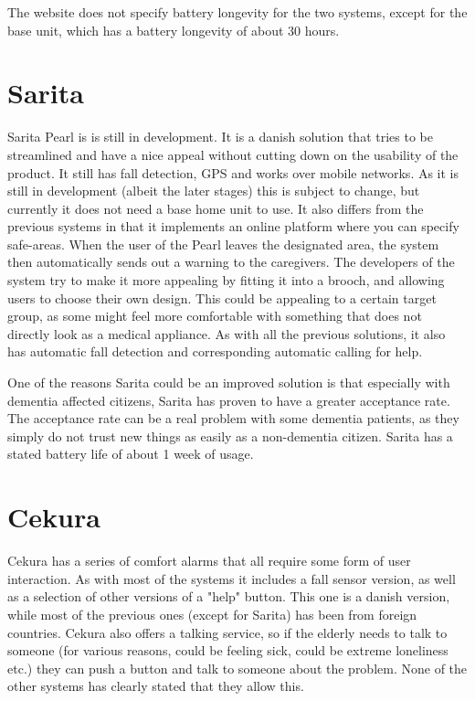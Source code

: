 The website does not specify battery longevity for the two systems, except for the base unit, which has a battery longevity of about 30 hours.

\section{Sarita}
Sarita Pearl is is still in development. It is a danish solution that tries to be streamlined and have a nice appeal without cutting down on the usability of the product. It still has fall detection, GPS and works over mobile networks. As it is still in development (albeit the later stages) this is subject to change, but currently it does not need a base home unit to use. It also differs from the previous systems in that it implements an online platform where you can specify safe-areas. When the user of the Pearl leaves the designated area, the system then automatically sends out a warning to the caregivers. The developers of the system try to make it more appealing by fitting it into a brooch, and allowing users to choose their own design. This could be appealing to a certain target group, as some might feel more comfortable with something that does not directly look as a medical appliance. As with all the previous solutions, it also has automatic fall detection and corresponding automatic calling for help. 

One of the reasons Sarita could be an improved solution is that especially with dementia affected citizens, Sarita has proven to have a greater acceptance rate. The acceptance rate can be a real problem with some dementia patients, as they simply do not trust new things as easily as a non-dementia citizen.
Sarita has a stated battery life of about 1 week of usage. 


\section{Cekura}
Cekura has a series of comfort alarms that all require some form of user interaction. As with most of the systems it includes a fall sensor version, as well as a selection of other versions of a "help" button. This one is a danish version, while most of the previous ones (except for Sarita) has been from foreign countries. Cekura also offers a talking service, so if the elderly needs to talk to someone (for various reasons, could be feeling sick, could be extreme loneliness etc.) they can push a button and talk to someone about the problem. None of the other systems has clearly stated that they allow this.

